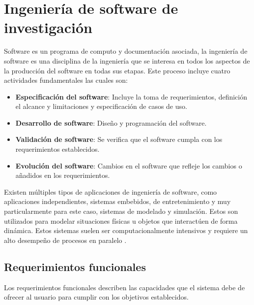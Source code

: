 \section{Ingeniería de software de investigación}

Software es un programa de computo y documentación asociada, la ingeniería de software es una disciplina de la ingeniería que se interesa en todos los aspectos de la producción del software en todas sus etapas. Este proceso incluye cuatro actividades fundamentales las cuales son:

\begin{itemize}
	\item \textbf{Especificación del software}: Incluye la toma de requerimientos, definición el alcance y limitaciones y especificación de casos de uso.  
	
	\item \textbf{Desarrollo de software}: Diseño y programación del software.
	
	\item \textbf{Validación de software}: Se verifica que el software cumpla con los requerimientos establecidos.
	
	\item \textbf{Evolución del software}: Cambios en el software que refleje los cambios o añadidos en los requerimientos.
\end{itemize}

Existen múltiples tipos de aplicaciones de ingeniería de software, como aplicaciones independientes, sistemas embebidos, de entretenimiento y muy particularmente para este caso, sistemas de modelado y simulación. Estos son utilizados para modelar situaciones físicas u objetos que interactúen de forma dinámica. Estos sistemas suelen ser computacionalmente intensivos y requiere un alto desempeño de procesos en paralelo \cite{ingenieria_1}.

\subsection{Requerimientos funcionales}

Los requerimientos funcionales describen las capacidades que el sistema debe de ofrecer al usuario para cumplir con los objetivos establecidos.

